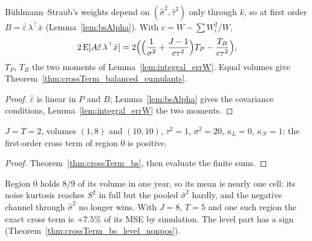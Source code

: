 \begin{theorem}\label{thm:crossTerm_bs}
  \leanok
  Bühlmann--Straub's weights depend on $(\hat\sigma^2, \hat\tau^2)$ only through $k$, so at first order
  $B = \hat\varepsilon\,\lambda^\top\bar x$ (Lemma~\ref{lem:bsAlpha}). With $c = W - \sum W_i^2/W$,
  \[ 2\operatorname{E}[A\hat\varepsilon\,\lambda^\top\bar x] = 2\Bigl(\Bigl(\frac1{\sigma^2} + \frac{J - 1}{c\tau^2}\Bigr)T_P
     - \frac{T_B}{c\tau^2}\Bigr), \]
  $T_P$, $T_B$ the two moments of Lemma~\ref{lem:integral_errW}. Equal volumes give
  Theorem~\ref{thm:crossTerm_balanced_cumulants}.
\end{theorem}
\begin{proof}
  \leanok
  $\hat\varepsilon$ is linear in $P$ and $B$; Lemma~\ref{lem:bsAlpha} gives the covariance conditions,
  Lemma~\ref{lem:integral_errW} the two moments.
\end{proof}

\begin{theorem}\label{thm:crossTerm_bs_pos_example}
  \leanok
  $J = T = 2$, volumes $(1, 8)$ and $(10, 10)$, $\tau^2 = 1$, $\sigma^2 = 20$, $\kappa_L = 0$, $\kappa_N = 1$: the first-order
  cross term of region 0 is positive.
\end{theorem}
\begin{proof}
  \leanok
  Theorem~\ref{thm:crossTerm_bs}, then evaluate the finite sums.
\end{proof}

\begin{remark}
  Region 0 holds $8/9$ of its volume in one year, so its mean is nearly one cell: its noise kurtosis
  reaches $S^2$ in full but the pooled $\hat\sigma^2$ hardly, and the negative channel through $\hat\sigma^2$ no
  longer wins. With $J = 8$, $T = 5$ and one such region the exact cross term is $+7.5\%$ of its MSE by
  simulation. The level part has a sign (Theorem~\ref{thm:crossTerm_bs_level_nonpos}).
\end{remark}

